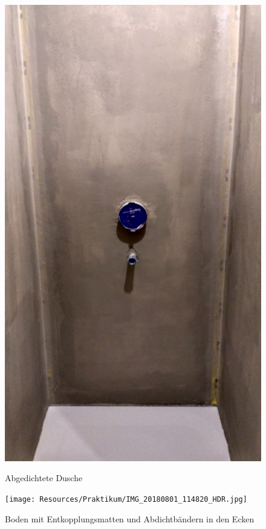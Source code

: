 \begin{figure}[h]
	\begin{center}
		\noindent\includegraphics[scale=0.1]{Resources/Praktikum/IMG_20180801_114911_HDR.jpg}
		\label{duscheDicht}
		\caption{Abgedichtete Dusche}	
	\end{center}
\end{figure}

\begin{figure}[h]
	\begin{center}
		\noindent\texttt{[image: Resources/Praktikum/IMG\_20180801\_114820\_HDR.jpg]}
		\label{bodenDicht}
		\caption{Boden mit Entkopplungsmatten und Abdichtbändern in den Ecken}	
	\end{center}
\end{figure}

